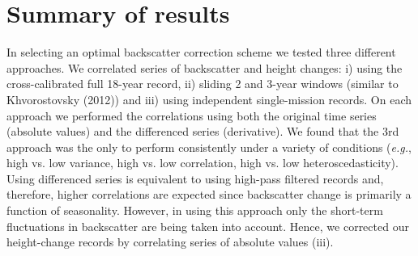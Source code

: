 \section*{Summary of results}


In selecting an optimal backscatter correction scheme we tested three different approaches. We correlated series of backscatter and height changes: i) using the cross-calibrated full 18-year record, ii) sliding 2 and 3-year windows (similar to Khvorostovsky (2012)) and iii) using independent single-mission records. On each approach we performed the correlations using both the original time series (absolute values) and the differenced series (derivative). We found that the 3rd approach was the only to perform consistently under a variety of conditions ({\it e.g.}, high vs. low variance, high vs. low correlation, high vs. low heteroscedasticity). Using differenced series is equivalent to using high-pass filtered records and, therefore, higher correlations are expected since backscatter change is primarily a function of seasonality. However, in using this approach only the short-term fluctuations in backscatter are being taken into account. Hence, we corrected our height-change records by correlating series of absolute values (iii).
